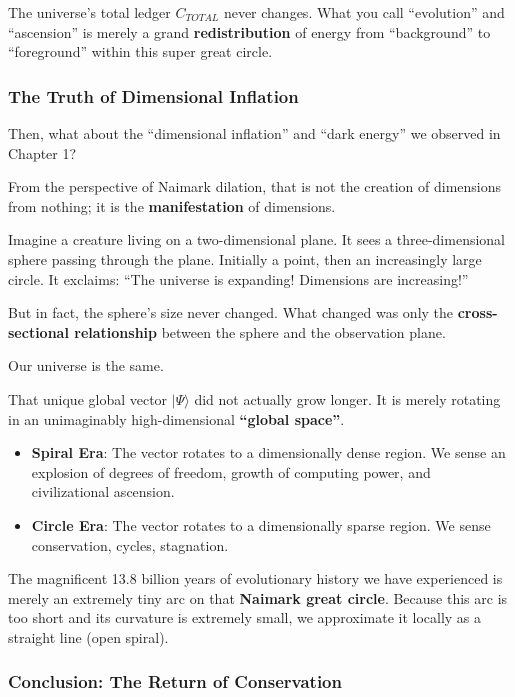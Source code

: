 The universe's total ledger $C_{TOTAL}$ never changes. What you call ``evolution'' and ``ascension'' is merely a grand \textbf{redistribution} of energy from ``background'' to ``foreground'' within this super great circle.

\subsubsection{The Truth of Dimensional Inflation}

Then, what about the ``dimensional inflation'' and ``dark energy'' we observed in Chapter 1?

From the perspective of Naimark dilation, that is not the creation of dimensions from nothing; it is the \textbf{manifestation} of dimensions.

Imagine a creature living on a two-dimensional plane. It sees a three-dimensional sphere passing through the plane. Initially a point, then an increasingly large circle. It exclaims: ``The universe is expanding! Dimensions are increasing!''

But in fact, the sphere's size never changed. What changed was only the \textbf{cross-sectional relationship} between the sphere and the observation plane.

Our universe is the same.

That unique global vector $|\Psi\rangle$ did not actually grow longer. It is merely rotating in an unimaginably high-dimensional \textbf{``global space''}.

\begin{itemize}
\item \textbf{Spiral Era}: The vector rotates to a dimensionally dense region. We sense an explosion of degrees of freedom, growth of computing power, and civilizational ascension.

\item \textbf{Circle Era}: The vector rotates to a dimensionally sparse region. We sense conservation, cycles, stagnation.
\end{itemize}

The magnificent 13.8 billion years of evolutionary history we have experienced is merely an extremely tiny arc on that \textbf{Naimark great circle}. Because this arc is too short and its curvature is extremely small, we approximate it locally as a straight line (open spiral).

\subsubsection{Conclusion: The Return of Conservation}

